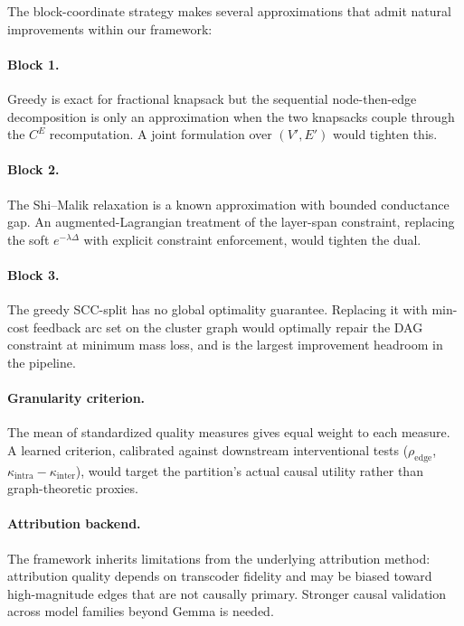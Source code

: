 \documentclass[table, 11pt]{article}
\begin{document}
The block-coordinate strategy makes several approximations that
admit natural improvements within our framework:

\paragraph{Block 1.} Greedy is exact for fractional knapsack but the
sequential node-then-edge decomposition is only an approximation when
the two knapsacks couple through the $C^E$ recomputation. A joint
formulation over $(V', E')$ would tighten this.

\paragraph{Block 2.} The Shi--Malik relaxation is a known
approximation with bounded conductance gap. An augmented-Lagrangian
treatment of the layer-span constraint, replacing the soft
$e^{-\lambda \Delta}$ with explicit constraint enforcement, would
tighten the dual.

\paragraph{Block 3.} The greedy SCC-split has no global optimality
guarantee. Replacing it with min-cost feedback arc set on the cluster
graph would optimally repair the DAG constraint at minimum mass loss,
and is the largest improvement headroom in the pipeline.

\paragraph{Granularity criterion.} The mean of standardized quality
measures gives equal weight to each measure. A learned criterion,
calibrated against downstream interventional tests
($\rho_{\text{edge}}$, $\kappa_{\text{intra}} - \kappa_{\text{inter}}$),
would target the partition's actual causal utility rather than
graph-theoretic proxies.

\paragraph{Attribution backend.} The framework inherits limitations
from the underlying attribution method: attribution quality depends
on transcoder fidelity and may be biased toward high-magnitude edges
that are not causally primary. Stronger causal validation across
model families beyond Gemma is needed.
\end{document}

